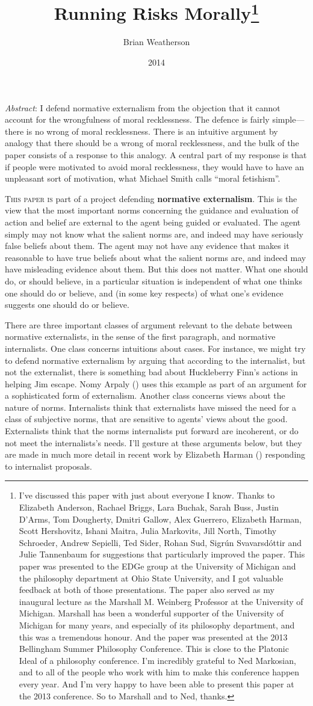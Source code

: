 \documentclass[
  11pt,
  letterpaper,
  DIV=11,
  numbers=noendperiod,
  twoside]{scrartcl}
\title{Running Risks Morally\thanks{I've discussed this paper with just
about everyone I know. Thanks to Elizabeth Anderson, Rachael Briggs,
Lara Buchak, Sarah Buss, Justin D'Arms, Tom Dougherty, Dmitri Gallow,
Alex Guerrero, Elizabeth Harman, Scott Hershovitz, Ishani Maitra, Julia
Markovits, Jill North, Timothy Schroeder, Andrew Sepielli, Ted Sider,
Rohan Sud, Sigrún Svavarsdóttir and Julie Tannenbaum for suggestions
that particularly improved the paper. This paper was presented to the
EDGe group at the University of Michigan and the philosophy department
at Ohio State University, and I got valuable feedback at both of those
presentations. The paper also served as my inaugural lecture as the
Marshall M. Weinberg Professor at the University of Michigan. Marshall
has been a wonderful supporter of the University of Michigan for many
years, and especially of its philosophy department, and this was a
tremendous honour. And the paper was presented at the 2013 Bellingham
Summer Philosophy Conference. This is close to the Platonic Ideal of a
philosophy conference. I'm incredibly grateful to Ned Markosian, and to
all of the people who work with him to make this conference happen every
year. And I'm very happy to have been able to present this paper at the
2013 conference. So to Marshall and to Ned, thanks.}}
\author{Brian Weatherson}
\date{2014}
\renewenvironment{abstract}
 {\vspace{-1.25cm}
 \quotation\small\noindent\emph{Abstract}:}
 {\endquotation}
\renewenvironment{abstract}
 {\quotation\small\noindent\emph{Abstract}:}
 {\endquotation\vspace{-0.02cm}}
\begin{document}
\maketitle
\begin{abstract}
I defend normative externalism from the objection that it cannot account
for the wrongfulness of moral recklessness. The defence is fairly
simple---there is no wrong of moral recklessness. There is an intuitive
argument by analogy that there should be a wrong of moral recklessness,
and the bulk of the paper consists of a response to this analogy. A
central part of my response is that if people were motivated to avoid
moral recklessness, they would have to have an unpleasant sort of
motivation, what Michael Smith calls ``moral fetishism''.
\end{abstract}


\lettrine{T}{his paper is} part of a project defending \textbf{normative
externalism}. This is the view that the most important norms concerning
the guidance and evaluation of action and belief are external to the
agent being guided or evaluated. The agent simply may not know what the
salient norms are, and indeed may have seriously false beliefs about
them. The agent may not have any evidence that makes it reasonable to
have true beliefs about what the salient norms are, and indeed may have
misleading evidence about them. But this does not matter. What one
should do, or should believe, in a particular situation is independent
of what one thinks one should do or believe, and (in some key respects)
of what one's evidence suggests one should do or believe.

There are three important classes of argument relevant to the debate
between normative externalists, in the sense of the first paragraph, and
normative internalists. One class concerns intuitions about cases. For
instance, we might try to defend normative externalism by arguing that
according to the internalist, but not the externalist, there is
something bad about Huckleberry Finn's actions in helping Jim escape.
Nomy Arpaly () uses this example as part
of an argument for a sophisticated form of externalism. Another class
concerns views about the nature of norms. Internalists think that
externalists have missed the need for a class of subjective norms, that
are sensitive to agents' views about the good. Externalists think that
the norms internalists put forward are incoherent, or do not meet the
internalists's needs. I'll gesture at these arguments below, but they
are made in much more detail in recent work by Elizabeth Harman
() responding to internalist proposals.
\end{document}

